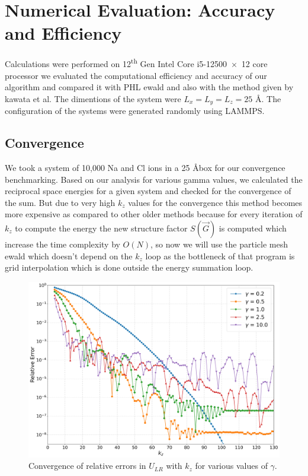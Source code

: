 \chapter{Numerical Evaluation: Accuracy and Efficiency}

\label{Chapter5} %

Calculations were performed on 12\textsuperscript{th} Gen Intel\textsuperscript{\textregistered} Core\texttrademark{} i5-12500~$\times$~12 core processor
we evaluated the computational efficiency and accuracy of our algorithm and compared it with PHL ewald and also with the method given by kawata et al.
The dimentions of the system were $L_x = L_y = L_z = 25$ \AA . The configuration of the systems were generated randomly using LAMMPS.

\section{Convergence}
We took a system of 10,000 Na and Cl ions in a 25 \AA box for our convergence benchmarking.
Based on our analysis for various gamma values, we calculated the reciprocal space energies for a given system and checked for the convergence of the sum. But due to very high $k_z$ values for the convergence this method becomes more expensive as compared to other older methods because for every iteration of $k_z$ to compute the energy the new structure factor $S(\vec G)$ is computed which increase the time complexity by $O(N)$, so now we will use the particle mesh ewald which doesn't depend on the $k_z$ loop as the bottleneck of that program is grid interpolation which is done outside the energy summation loop.
\begin{figure}[H]
    \centering
    \includegraphics[scale=0.4]{images/logerror_vs_kz_forreport.jpg}
    \caption{Convergence of relative errors in $U_{LR}$ with $k_z$ for various values of $\gamma$.}
    \label{fig:result1}
\end{figure}

